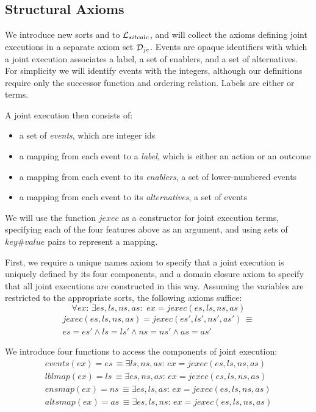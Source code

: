 \subsection{Structural Axioms}

We introduce new sorts and  to $\mathcal{L}_{sitcalc}$,
and will collect the axioms defining joint executions in a separate
axiom set $\mathcal{D}_{je}$. Events are opaque identifiers with which a
joint execution associates a label, a set of enablers, and a set of
alternatives. For simplicity we will identify events with the integers,
although our definitions require only the successor function and ordering
relation. Labels are either  or  terms.

A joint execution then consists of:

\begin{itemize}
\item a set of \emph{events}, which are integer ids 
\item a mapping from each event to a \emph{label}, which is either an action
or an outcome 
\item a mapping from each event to its \emph{enablers}, a set of lower-numbered
events 
\item a mapping from each event to its \emph{alternatives}, a set of events 
\end{itemize}
We will use the function $jexec$ as a constructor for joint execution
terms, specifying each of the four features above as an argument,
and using sets of $key\#value$ pairs to represent a mapping. 

First, we require a unique names axiom to specify that a joint execution
is uniquely defined by its four components, and a domain closure axiom
to specify that all joint executions are constructed in this way.
Assuming the variables are restricted to the appropriate sorts, the
following axioms suffice:\[
\forall ex:\,\exists es,ls,ns,as:\,\, ex=jexec(es,ls,ns,as)\]
\begin{multline*}
jexec(es,ls,ns,as)=jexec(es',ls',ns',as')\,\equiv\\
es=es'\wedge ls=ls'\wedge ns=ns'\wedge as=as'\end{multline*}


We introduce four functions to access the components of joint execution:\begin{gather*}
events(ex)=es\,\equiv\exists ls,ns,as:\, ex=jexec(es,ls,ns,as)\\
lblmap(ex)=ls\,\equiv\exists es,ns,as:\, ex=jexec(es,ls,ns,as)\\
ensmap(ex)=ns\,\equiv\exists es,ls,as:\, ex=jexec(es,ls,ns,as)\\
altsmap(ex)=as\,\equiv\exists es,ls,ns:\, ex=jexec(es,ls,ns,as)\end{gather*}


